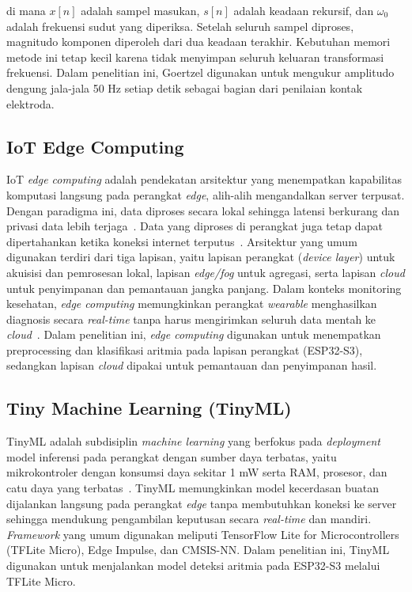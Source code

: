 \noindent di mana $x[n]$ adalah sampel masukan, $s[n]$ adalah keadaan rekursif, dan $\omega_0$ adalah frekuensi sudut yang diperiksa. Setelah seluruh sampel diproses, magnitudo komponen diperoleh dari dua keadaan terakhir. Kebutuhan memori metode ini tetap kecil karena tidak menyimpan seluruh keluaran transformasi frekuensi. Dalam penelitian ini, Goertzel digunakan untuk mengukur amplitudo dengung jala-jala 50 Hz setiap detik sebagai bagian dari penilaian kontak elektroda.

\subsection{IoT Edge Computing}

IoT \textit{edge computing} adalah pendekatan arsitektur yang menempatkan kapabilitas komputasi langsung pada perangkat \textit{edge}, alih-alih mengandalkan server terpusat. Dengan paradigma ini, data diproses secara lokal sehingga latensi berkurang dan privasi data lebih terjaga~\cite{cao_2020}. Data yang diproses di perangkat juga tetap dapat dipertahankan ketika koneksi internet terputus~\cite{yaacoub_2020}. Arsitektur yang umum digunakan terdiri dari tiga lapisan, yaitu lapisan perangkat (\textit{device layer}) untuk akuisisi dan pemrosesan lokal, lapisan \textit{edge/fog} untuk agregasi, serta lapisan \textit{cloud} untuk penyimpanan dan pemantauan jangka panjang. Dalam konteks monitoring kesehatan, \textit{edge computing} memungkinkan perangkat \textit{wearable} menghasilkan diagnosis secara \textit{real-time} tanpa harus mengirimkan seluruh data mentah ke \textit{cloud}~\cite{tinyml_iot_review}. Dalam penelitian ini, \textit{edge computing} digunakan untuk menempatkan preprocessing dan klasifikasi aritmia pada lapisan perangkat (ESP32-S3), sedangkan lapisan \textit{cloud} dipakai untuk pemantauan dan penyimpanan hasil.

\subsection{Tiny Machine Learning (TinyML)}

TinyML adalah subdisiplin \textit{machine learning} yang berfokus pada
\textit{deployment} model inferensi pada perangkat dengan sumber daya
terbatas, yaitu mikrokontroler dengan konsumsi daya sekitar 1 mW serta RAM,
prosesor, dan catu daya yang terbatas~\cite{tinyml_iot_review}.
TinyML memungkinkan model kecerdasan buatan
dijalankan langsung pada perangkat \textit{edge} tanpa membutuhkan koneksi ke
server sehingga mendukung pengambilan keputusan secara \textit{real-time} dan
mandiri. \textit{Framework} yang umum digunakan meliputi TensorFlow Lite for
Microcontrollers (TFLite Micro), Edge Impulse, dan CMSIS-NN. Dalam
penelitian ini, TinyML digunakan untuk menjalankan model deteksi aritmia
pada ESP32-S3 melalui TFLite Micro.

